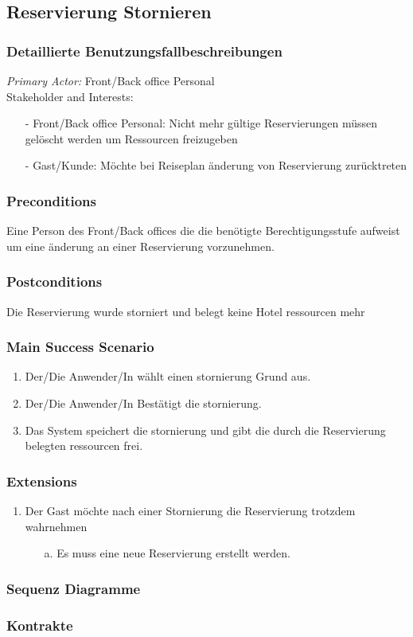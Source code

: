 \documentclass[./detailed_overview_usecases.tex]{subfiles}
\begin{document}
    \subsection{Reservierung Stornieren}
    \subsubsection{Detaillierte Benutzungsfallbeschreibungen}
    \textit{Primary Actor:}
    Front/Back office Personal
    \\
    Stakeholder and Interests:
    \begin{itemize}
        \item[-] Front/Back office Personal: Nicht mehr gültige Reservierungen müssen gelöscht werden um Ressourcen freizugeben
        \item[-] Gast/Kunde: Möchte bei Reiseplan änderung von Reservierung zurücktreten
    \end{itemize}

    \subsubsection*{Preconditions}
    Eine Person des Front/Back offices die die benötigte Berechtigungsstufe aufweist um eine änderung an einer Reservierung vorzunehmen.

    \subsubsection*{Postconditions}
    Die Reservierung wurde storniert und belegt keine Hotel ressourcen mehr

    \subsubsection*{Main Success Scenario}
    \begin{enumerate}
        \item Der/Die Anwender/In wählt einen stornierung Grund aus.
        \item Der/Die Anwender/In Bestätigt die stornierung.
        \item Das System speichert die stornierung und gibt die durch die Reservierung belegten ressourcen frei.
    \end{enumerate}

    \subsubsection*{Extensions}
    \begin{enumerate}
        \item Der Gast möchte nach einer Stornierung die Reservierung trotzdem wahrnehmen
        \begin{itemize}
            \item[a.] Es muss eine neue Reservierung erstellt werden.
        \end{itemize}
    \end{enumerate}

    \subsubsection{Sequenz Diagramme}
    \subsubsection{Kontrakte}
\end{document}
